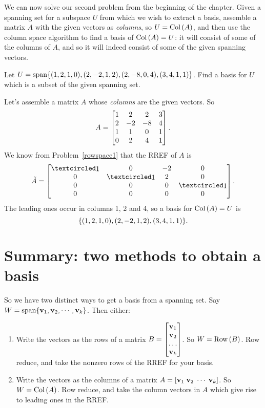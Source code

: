  


We can now solve our second problem from the beginning of the chapter. Given a spanning set for a subspace $U$ from which we wish to extract a basis, assemble a matrix $A$ with the given vectors as {\it columns}, so $U=\operatorname{Col\,}(A)$, and then use the column space algorithm to find a basis of $\operatorname{Col\,}(A)=U$: it will consist of some of the columns of $A$, and so it will indeed consist of some of the given spanning vectors.

\begin{myprob}
Let $U=\textrm{span}\{(1, 2, 1, 0), (2, -2, 1, 2), (2, -8, 0, 4), (3, 4, 1, 1)\}$. Find a basis for $U$ which is a subset of the given spanning set.

\begin{mysol} Let's assemble a matrix $A$ whose {\it columns} are the given vectors. So 
$$A=\left[ \begin{matrix} 
1&2&2&3\\2&-2&-8&4\\1&1&0&1\\0&2&4&1 \end{matrix} \right].$$
We know from Problem~\ref{rowspace1} that the RREF of $A$ is
$$\tilde A= \mat{\pivot & 0 & -2 & 0\\ 0 & \pivot & 2 & 0\\ 0 & 0 & 0 & \pivot\\ 0 & 0 & 0 & 0}.$$ The leading ones occur in columns 1, 2 and 4, so a basis for $\operatorname{Col\,}(A)=U$ is 
$$\{(1, 2, 1, 0), (2, -2, 1, 2),  (3, 4, 1, 1) \}.$$
\end{mysol}
\end{myprob}

\section{Summary:  two methods to obtain a basis}

So we have two distinct ways to get a basis from a spanning set.
Say $W = \textrm{span}\{\mathbf{v}_1, \mathbf{v}_2, \cdots, \mathbf{v}_k\}$.  Then either:
\begin{enumerate}

\item Write the vectors as the rows of a matrix $B = \left[ \begin{matrix} \mathbf{v}_1 \\ \mathbf{v}_2 \\ \ldots \\ \mathbf{v}_k  \end{matrix} \right]$.  So $W = \operatorname{Row\,}(B)$.  Row reduce, and 
take the   nonzero rows of the RREF for your basis.
\item Write the vectors as the columns of a matrix $A= [\mathbf{v}_1 \; \mathbf{v}_2 \; \cdots \; \mathbf{v}_k]$.  So $W = \operatorname{Col\,}(A)$.  Row reduce, and
take the column vectors  in $A$ which give rise to leading ones in the RREF.


\end{enumerate}

